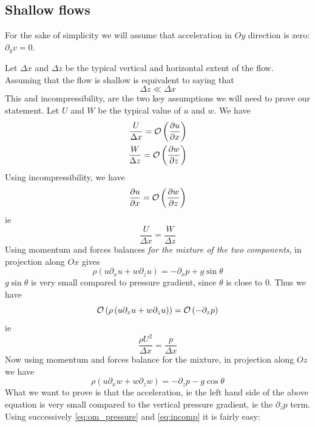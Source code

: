 \subsection{Shallow flows}
For the sake of simplicity we will assume that acceleration in $Oy$ direction is zero: $ \partial_y v = 0 $.

Let $\Delta x$ and $\Delta z$ be the typical vertical and horizontal extent of the flow. Assuming that the flow is shallow is equivalent to saying that 
\begin{equation}
	\Delta z \ll \Delta x
\end{equation} 
This and incompressibility, are the two key assumptions we will need to prove our statement. 
Let $U$ and $W$ be the typical value of $u$ and $w$. We have
\begin{align}
	\frac{U}{\Delta x} =  \mathcal{O} \left( { \frac{\partial u}{\partial x} } \right)  \\
	\frac{W}{\Delta z} =  \mathcal{O} \left( { \frac{\partial w}{\partial z} } \right) 
\end{align}
Using incompressibility, we have
\begin{equation}
	\frac{\partial u}{\partial x} =  \mathcal{O} \left( { \frac{\partial w}{\partial z} } \right)  
\end{equation}
ie
\begin{equation} \label{eq:incomp}
	\frac{U}{\Delta x} = \frac{W}{\Delta z}
\end{equation}
Using momentum and forces balances \textit{for the mixture of the two components}, in projection along $Ox$ gives
\begin{equation}
	\rho \left( u \partial_x u + w \partial_z u \right) = -\partial_x p +g \sin \theta
\end{equation} 
$g \sin \theta$ is very small compared to pressure gradient, since $\theta$ is close to $0$. Thus we have
\begin{equation}
	 \mathcal{O} \left( { \rho \left( u \partial_x u + w \partial_z u \right) } \right)  =   \mathcal{O} \left( { -\partial_x p } \right) 
\end{equation}
ie
\begin{equation} \label{eq:om_pressure}
	 \frac{\rho U^2}{\Delta x} = \frac{p}{\Delta x}
\end{equation}
Now using momentum and forces balance for the mixture, in projection along $Oz$ we have
\begin{equation} \label{eq:z_momentum}
	\rho \left( u \partial_x w + w \partial_z w \right) = -\partial_z p -g \cos \theta
\end{equation}
What we want to prove is that the acceleration, ie the left hand side of the above equation is very small compared to the vertical pressure gradient, ie the $\partial_z p$ term. Using successively \ref{eq:om_pressure} and \ref{eq:incomp} it is fairly easy:
